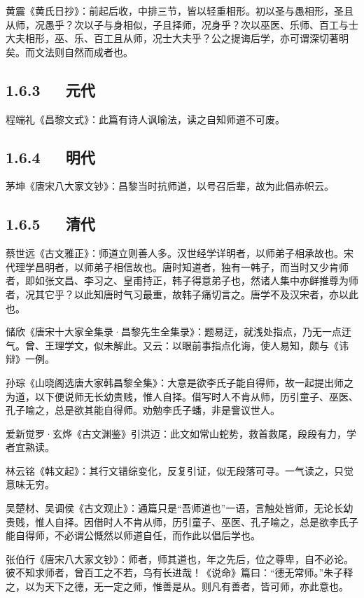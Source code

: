 \documentclass[letterpaper,10pt,english]{sphinxmanual}
\begin{document}
黄震《黄氏日抄》：前起后收，中排三节，皆以轻重相形。初以圣与愚相形，圣且从师，况愚乎？次以子与身相似，子且择师，况身乎？次以巫医、乐师、百工与士大夫相形，巫、乐、百工且从师，况士大夫乎？公之提诲后学，亦可谓深切著明矣。而文法则自然而成者也。


\subsection{1.6.3   元代}
\label{\detokenize{p01_u6563_u6587/_u97e9_u6108-_u5e08_u8bf4:id11}}
程端礼《昌黎文式》：此篇有诗人讽喻法，读之自知师道不可废。


\subsection{1.6.4   明代}
\label{\detokenize{p01_u6563_u6587/_u97e9_u6108-_u5e08_u8bf4:id12}}
茅坤《唐宋八大家文钞》：昌黎当时抗师道，以号召后辈，故为此倡赤帜云。


\subsection{1.6.5   清代}
\label{\detokenize{p01_u6563_u6587/_u97e9_u6108-_u5e08_u8bf4:id13}}
蔡世远《古文雅正》：师道立则善人多。汉世经学详明者，以师弟子相承故也。宋代理学昌明者，以师弟子相信故也。唐时知道者，独有一韩子，而当时又少肯师者，即如张文昌、李习之、皇甫持正，韩子得意弟子也，然诸人集中亦鲜推尊为师者，况其它乎？以此知唐时气习最重，故韩子痛切言之。唐学不及汉宋者，亦以此也。

储欣《唐宋十大家全集录·昌黎先生全集录》：题易迂，就浅处指点，乃无一点迂气。曾、王理学文，似未解此。又云：以眼前事指点化诲，使人易知，颇与《讳辩》一例。

孙琮《山晓阁选唐大家韩昌黎全集》：大意是欲李氏子能自得师，故一起提出师之为道，以下便说师无长幼贵贱，惟人自择。借写时人不肯从师，历引童子、巫医、孔子喻之，总是欲其能自得师。劝勉李氏子蟠，非是訾议世人。

爱新觉罗·玄烨《古文渊鉴》引洪迈：此文如常山蛇势，救首救尾，段段有力，学者宜熟读。

林云铭《韩文起》：其行文错综变化，反复引证，似无段落可寻。一气读之，只觉意味无穷。

吴楚材、吴调侯《古文观止》：通篇只是“吾师道也”一语，言触处皆师，无论长幼贵贱，惟人自择。因借时人不肯从师，历引童子、巫医、孔子喻之，总是欲李氏子能自得师，不必谓公慨然以师道自任，而作此以倡后学也。

张伯行《唐宋八大家文钞》：师者，师其道也，年之先后，位之尊卑，自不必论。彼不知求师者，曾百工之不若，乌有长进哉！《说命》篇曰：“德无常师。”朱子释之，以为天下之德，无一定之师，惟善是从。则凡有善者，皆可师，亦此意也。
\end{document}
